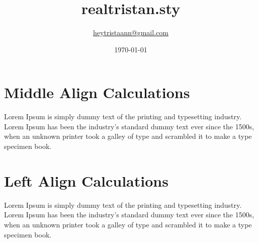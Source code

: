 \documentclass{article}
\title{realtristan.sty}
\author{\href{mailto:heytristaann@gmail.com}{heytristaann@gmail.com}}
\date{\today}
\begin{document}
\maketitle

\section{Middle Align Calculations} {
  Lorem Ipsum is simply dummy text of the printing and typesetting industry. Lorem Ipsum has been the industry's standard dummy text ever since the 1500s, when an unknown printer took a galley of type and scrambled it to make a type specimen book.
  \malign*{
    \therefore \kina{}
  }
 }
 
\section{Left Align Calculations} {
  Lorem Ipsum is simply dummy text of the printing and typesetting industry. Lorem Ipsum has been the industry's standard dummy text ever since the 1500s, when an unknown printer took a galley of type and scrambled it to make a type specimen book.
  \lalign{
      \therefore \kinb{}
  }
 }
\end{document}
